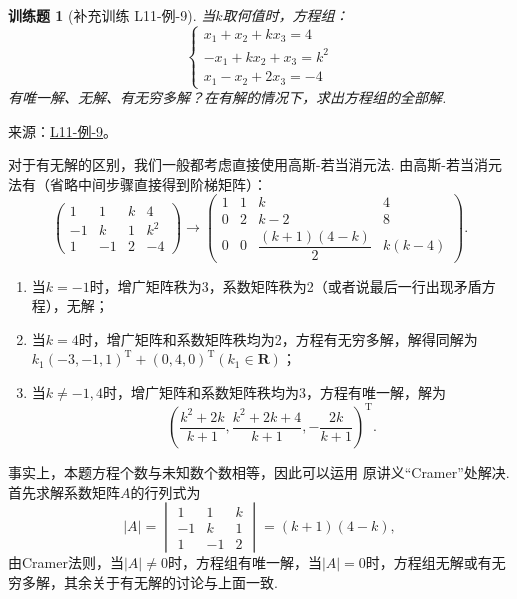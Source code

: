 \documentclass[UTF8,12pt,a4paper,fontset=fandol]{ctexart}
\newtheorem{exercise}{训练题}[section]
\begin{document}
\begin{exercise}[补充训练 L11-例-9]\label{prob:L11-例-9}
当$k$取何值时，方程组：
    \[\begin{cases}
            x_1+x_2+kx_3=4 \\ -x_1+kx_2+x_3=k^2 \\ x_1-x_2+2x_3=-4
        \end{cases}\]
    有唯一解、无解、有无穷多解？在有解的情况下，求出方程组的全部解.
\end{exercise}
\noindent 来源：\href{https://github.com/yhwu-is/Linear-Algebra-Left-Undone/blob/new/%E8%AE%B2%E4%B9%89/%E4%B8%93%E9%A2%98/11%20%E6%9C%9D%E8%8A%B1%E5%A4%95%E6%8B%BE.tex}{L11-例-9}。
\begin{solve}
对于有无解的区别，我们一般都考虑直接使用高斯-若当消元法. 由高斯-若当消元法有（省略中间步骤直接得到阶梯矩阵）：
    \[\begin{pmatrix}
            1  & 1  & k & 4   \\
            -1 & k  & 1 & k^2 \\
            1  & -1 & 2 & -4
        \end{pmatrix}\to\begin{pmatrix}
            1 & 1 & k                     & 4      \\
            0 & 2 & k-2                   & 8      \\
            0 & 0 & \dfrac{(k+1)(4-k)}{2} & k(k-4)
        \end{pmatrix}.\]
    \begin{enumerate}
        \item 当$k=-1$时，增广矩阵秩为3，系数矩阵秩为2（或者说最后一行出现矛盾方程），无解；

        \item 当$k=4$时，增广矩阵和系数矩阵秩均为2，方程有无穷多解，解得同解为$k_1(-3,-1,1)^{\mathrm{T}}+(0,4,0)^{\mathrm{T}}(k_1\in\mathbf{R})$；

        \item 当$k\neq-1,4$时，增广矩阵和系数矩阵秩均为3，方程有唯一解，解为
              \[(\dfrac{k^2+2k}{k+1},\dfrac{k^2+2k+4}{k+1},-\dfrac{2k}{k+1})^{\mathrm{T}}.\]
    \end{enumerate}

    事实上，本题方程个数与未知数个数相等，因此可以运用 原讲义“Cramer”处解决. 首先求解系数矩阵$A$的行列式为
    \[|A|=\begin{vmatrix}
            1  & 1  & k \\
            -1 & k  & 1 \\
            1  & -1 & 2
        \end{vmatrix}=(k+1)(4-k),\]
    由Cramer法则，当$|A|\neq 0$时，方程组有唯一解，当$|A|=0$时，方程组无解或有无穷多解，其余关于有无解的讨论与上面一致.
\end{solve}
\end{document}
